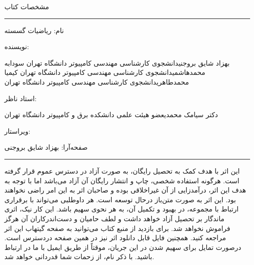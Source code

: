 \newpage
\thispagestyle{empty}
\begin{center}
    مشخصات کتاب
\end{center}

\rule{\textwidth}{0.5pt}

\scriptsize{

نام: ریاضیات گسسته

نویسنده:
\begin{AFFILIATIONS}
    \AFFILIATIONROW
    {بهزاد شایق بروجنی}{دانشجوی کارشناسی مهندسی کامپیوتر دانشگاه تهران}{}
    {سودابه محمدهاشمی}{دانشجوی کارشناسی مهندسی کامپیوتر دانشگاه تهران}{}
    {کیمیا محمدطاهری}{دانشجوی کارشناسی مهندسی کامپیوتر دانشگاه تهران}{}
\end{AFFILIATIONS}

استاد ناظر:
\begin{AFFILIATIONS}
    \AFFILIATIONROW
    {دکتر سیامک محمدی}{عضو هیئت علمی دانشکده برق و کامپیوتر دانشگاه تهران}{}
    {}{}{}
    {}{}{}
\end{AFFILIATIONS}

ویراستار:

صفحه‌آرا:
بهزاد شایق بروجنی

}

\rule{\textwidth}{0.5pt}

\scriptsize{
\p
این اثر با هدف کمک به تحصیل رایگان، به صورت آزاد در دسترس عموم قرار گرفته است.
هرگونه استفاده شخصی، چاپ و انتشار رایگان آن آزاد می‌باشد اما
با توجه به هدف این اثر، درآمدزایی از آن غیراخلاقی بوده و صاحبان اثر
به این امر راضی نخواهند بود.
\p
این اثر به صورت متن‌باز درحال توسعه است. هر داوطلبی می‌تواند
با برقراری ارتباط با مجموعه، در بهبود و تکمیل آن، به هر نحوی سهیم باشد.
این کار نیک، اثری ماندگار بر تحصیل آزاد خواهد داشت و لطف
حامیان و دست‌اندرکاران آن هرگز فراموش نخواهد شد.
\p
برای بازدید از منبع کتاب می‌توانید به صفحه
گیتهاب
این اثر مراجعه کنید.
همچنین فایل قابل دانلود اثر نیز در
همین صفحه
دردسترس است.
درصورت تمایل برای سهیم شدن در این جریان،
موقتاً از طریق
ایمیل
با ما در ارتباط باشید.
با ذکر نام، از زحمات شما قدردانی خواهد شد.
}

